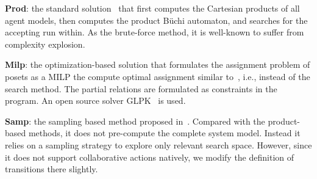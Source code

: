 \textbf{Prod}: the standard solution~\cite{baier2008principles}
that first computes
the Cartesian products of all agent models,
then computes the product B\"uchi automaton,
and searches for the accepting run within.
As the brute-force method,
it is well-known to suffer from complexity explosion.

\textbf{Milp}: the optimization-based solution that
formulates the assignment problem of posets as a MILP
the compute optimal assignment similar
to~\cite{luo2021temporal, jones2019scratchs},
i.e., instead of the search method.
The partial relations are formulated as constraints
in the program.
An open source solver GLPK~\cite{makhorin2008glpk} is used.

\textbf{Samp}: the sampling based method proposed
in~\cite{kantaros2020stylus}.
Compared with the product-based methods, it does not pre-compute
the complete system model. Instead it relies on a sampling strategy
to explore only relevant search space.
However, since it does not support collaborative actions natively,
we modify the definition of transitions there slightly.

